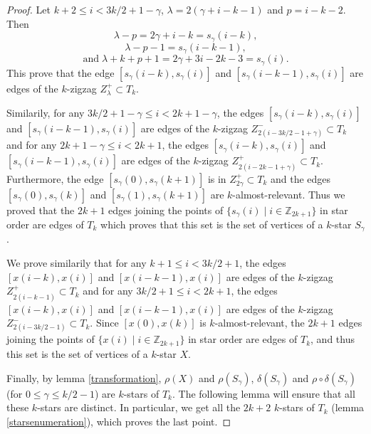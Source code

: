 \documentclass[12pt]{amsart}
\begin{document}
\begin{proof}
Let $k+2\le i< 3k/2+1-\gamma$, $\lambda=2(\gamma+i-k-1)$ and $p=i-k-2$. Then
$$\lambda-p=2\gamma+i-k=s_{\gamma}(i-k),$$
$$\lambda-p-1=s_{\gamma}(i-k-1),$$
$$\mathrm{and}\; \lambda+k+p+1=2\gamma+3i-2k-3=s_\gamma(i).$$
This prove that the edge $[s_{\gamma}(i-k),s_\gamma(i)]$ and $[s_{\gamma}(i-k-1),s_{\gamma}(i)]$ are edges of the $k$-zigzag $Z^+_{\lambda}\subset T_k$.

Similarily, for any $3k/2+1-\gamma\le i< 2k+1-\gamma$, the edges $[s_{\gamma}(i-k),s_\gamma(i)]$ and $[s_{\gamma}(i-k-1),s_\gamma(i)]$ are edges of the $k$-zigzag $Z^-_{2(i-3k/2-1+\gamma)}\subset T_k$ and for any $2k+1-\gamma\le i< 2k+1$, the edges $[s_{\gamma}(i-k),s_\gamma(i)]$ and $[s_{\gamma}(i-k-1),s_\gamma(i)]$ are edges of the $k$-zigzag $Z^+_{2(i-2k-1+\gamma)}\subset T_k$. Furthermore, the edge $[s_\gamma(0),s_{\gamma}(k+1)]$ is in $Z^+_{2\gamma}\subset T_k$ and the edges $[s_\gamma(0),s_{\gamma}(k)]$ and $[s_\gamma(1),s_{\gamma}(k+1)]$ are $k$-almost-relevant. Thus we proved that the $2k+1$ edges joining the points of $\{s_{\gamma}(i)\;|\; i\in\mathbb{Z}_{2k+1}\}$ in star order are edges of $T_k$ which proves that this set is the set of vertices of a $k$-star $S_{\gamma}$.


\bigskip
We prove similarily that for any $k+1\le i< 3k/2+1$, the edges $[x(i-k),x(i)]$ and $[x(i-k-1),x(i)]$ are edges of the $k$-zigzag $Z^+_{2(i-k-1)}\subset T_k$ and for any $3k/2+1\le i< 2k+1$, the edges $[x(i-k),x(i)]$ and $[x(i-k-1),x(i)]$ are edges of the $k$-zigzag $Z^-_{2(i-3k/2-1)}\subset T_k$. Since $[x(0),x(k)]$ is $k$-almost-relevant, the $2k+1$ edges joining the points of $\{x(i)\;|\; i\in\mathbb{Z}_{2k+1}\}$ in star order are edges of $T_k$, and thus this set is the set of vertices of a $k$-star $X$.

\bigskip
Finally, by lemma \ref{transformation}, $\rho(X)$ and $\rho(S_\gamma)$, $\delta(S_\gamma)$ and $\rho\circ\delta(S_\gamma)$ (for $0\le\gamma\le k/2-1$) are $k$-stars of $T_k$. The following lemma will ensure that all these $k$-stars are distinct. In particular, we get all the $2k+2$ $k$-stars of $T_k$ (lemma \ref{starsenumeration}), which proves the last point.
\end{proof}
\end{document}
